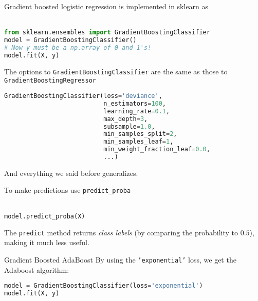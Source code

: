 %
\begin{frame}[fragile]
Gradient boosted logistic regression is implemented in sklearn as\\~\\

\begin{lstlisting}[language=python]
from sklearn.ensembles import GradientBoostingClassifier
model = GradientBoostingClassifier()
# Now y must be a np.array of 0 and 1's!
model.fit(X, y)
\end{lstlisting}
\end{frame}
%
\begin{frame}[fragile]
The options to \texttt{GradientBoostingClassifier} are the same as those to \texttt{GradientBoostingRegressor}

\begin{lstlisting}[language=python]
GradientBoostingClassifier(loss='deviance',
                           n_estimators=100, 
                           learning_rate=0.1, 
                           max_depth=3,
                           subsample=1.0, 
                           min_samples_split=2, 
                           min_samples_leaf=1, 
                           min_weight_fraction_leaf=0.0,
                           ...)
\end{lstlisting}

And everything we said before generalizes.
\end{frame}
%
\begin{frame}[fragile]
To make predictions use \texttt{predict\_proba}\\~\\

\begin{lstlisting}[language=python]
model.predict_proba(X)
\end{lstlisting}

The \texttt{predict} method returns \textit{class labels} (by comparing the probability to $0.5$), making it much less useful.
\end{frame}
%
\begin{frame}[fragile]{Gradient Boosted AdaBoost}
By using the \texttt{'exponential'} loss, we get the Adaboost algorithm:

\begin{lstlisting}[language=python]
model = GradientBoostingClassifier(loss='exponential')
model.fit(X, y)
\end{lstlisting}

\end{frame}

